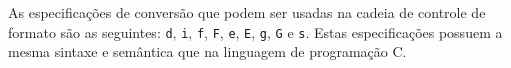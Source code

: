 \documentclass[11pt, brazil]{report}
\def\para#1{\noindent{\bf#1}}
\begin{document}
As especificações de conversão que podem ser usadas na cadeia de controle
de formato são as seguintes: {\tt d}, {\tt i}, {\tt f}, {\tt F},
{\tt e}, {\tt E}, {\tt g}, {\tt G} e {\tt s}. Estas especificações
possuem a mesma sintaxe e semântica que na linguagem de programação C.


%
%
%
%
%
%
%
%
%
%
%
%
%
\end{document}
